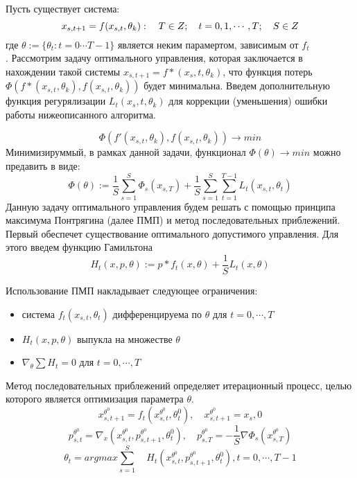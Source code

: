 \documentclass{article}
\begin{document}
Пусть существует система:
\begin{equation}
x_{s,t+1} = f(x_{s,t}, \theta_k): \quad T \in Z; \quad t=0,1,\cdots ,T; \quad S \in Z\\ 
\end{equation}
где $ \theta := \{\theta_t : t = 0\cdots T - 1 \}$ является неким парамертом, зависимым от $f_t$\\.
Рассмотрим задачу оптимального управления, которая заключается в нахождении такой системы $x_{s,t+1} = f*(x_s,t, \theta_k)$, что функция потерь
   \\ $\Phi(f*(x_{s,t}, \theta_k),f(x_{s,t}, \theta_k))$
будет минимальна. Введем дополнительную функция регурялизации $L_t(x_s,t, \theta_k)$ для коррекции (уменьшения) ошибки работы нижеописанного алгоритма.  

\begin{equation}
    \Phi(f'(x_{s,t}, \theta_k),f(x_{s,t}, \theta_k))\rightarrow min
\end{equation}
Минимизируммый, в рамках данной задачи, функционал $\Phi (\theta)\rightarrow min$ можно предавить в виде:
\begin{equation}
    \Phi(\theta):=\frac1S\sum\limits_{s=1}^S \Phi_s(x_{s,T})+ \frac1S\sum\limits_{s=1}^S\sum\limits_{t=1}^{T-1} L_t(x_{s,t},\theta_t)
\end{equation}
Данную задачу оптимального управления будем решать с помощью принципа максимума Понтрягина (далее ПМП) и метод последовательных приблежений. Первый обеспечет существование оптимального допустимого управления. Для этого введем функцию Гамильтона
\begin{equation}
    H_t(x,p,\theta):= p*f_t(x,\theta)+ \frac1S L_t(x,\theta)
\end{equation}

Использование ПМП накладывает следующее ограничения:
\begin{itemize}
\item система $f_t(x_{s,t},\theta_t)$ дифференцируема по $\theta$ для $t=0,\cdots,T$ 
\item $H_t(x,p,\theta)$ выпукла на множестве $\theta$  
\item $\nabla_\theta \sum H_t=0$ для  $t=0,\cdots,T$
\end{itemize}

Метод последовательных приблежений определяет итерационный процесс, целью которого является оптимизация параметра $\theta$.
\begin{equation}
    x_{s,t+1}^{\theta^0} = f_t(x_{s,t}^{\theta^0},\theta_t^0), \quad
    x_{s,t+1}^{\theta^0} = x_s,0
\end{equation}
\begin{equation}
    p_{s,t}^{\theta^0} = \nabla_x( x_{s,t}^{\theta^0}, p_{s,t+1}^{\theta^0}, \theta_t^0),  \quad
    p_{s,T}^{\theta^0} = -\frac1S \nabla \Phi_s(x_{s,T}^{\theta^0})
\end{equation}
\begin{equation}
    \theta_t = argmax \sum\limits_{s=1}^{S} \quad
    H_t(x_{s,t}^{\theta^0},p_{s, t+1}^{\theta^0},\theta_t^0),
    t=0,\cdots,T-1
\end{equation}
\end{document}

